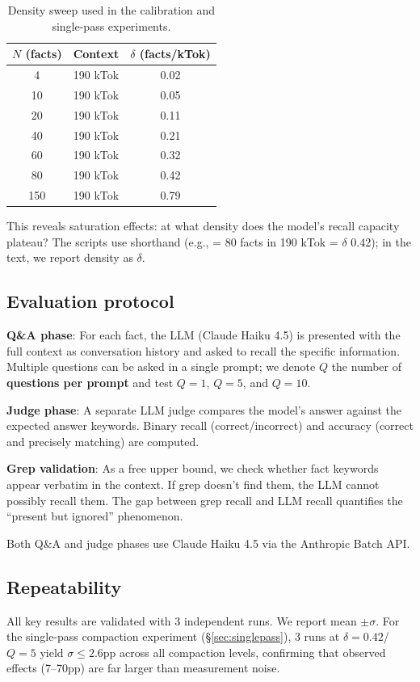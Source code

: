 \begin{table}[h]
\centering
\caption{Density sweep used in the calibration and single-pass experiments.}
\label{tab:density-sweep}
\begin{tabular}{ccc}
\toprule
$N$ (facts) & Context & $\delta$ (facts/kTok) \\
\midrule
4   & 190 kTok & 0.02 \\
10  & 190 kTok & 0.05 \\
20  & 190 kTok & 0.11 \\
40  & 190 kTok & 0.21 \\
60  & 190 kTok & 0.32 \\
80  & 190 kTok & 0.42 \\
150 & 190 kTok & 0.79 \\
\bottomrule
\end{tabular}
\end{table}

This reveals saturation effects: at what density does the model's recall
capacity plateau? The scripts use shorthand  (e.g.,  = 80 facts in
190 kTok = $\delta$ 0.42); in the text, we report density as $\delta$.

\subsection{Evaluation protocol}
\label{sec:eval-protocol}

\textbf{Q\&A phase}: For each fact, the LLM (Claude Haiku 4.5) is presented with
the full context as conversation history and asked to recall the specific
information. Multiple questions can be asked in a single prompt; we denote
$Q$ the number of \textbf{questions per prompt} and test $Q=1$, $Q=5$, and $Q=10$.

\textbf{Judge phase}: A separate LLM judge compares the model's answer against the
expected answer keywords. Binary recall (correct/incorrect) and accuracy
(correct and precisely matching) are computed.

\textbf{Grep validation}: As a free upper bound, we check whether fact keywords
appear verbatim in the context. If grep doesn't find them, the LLM cannot
possibly recall them. The gap between grep recall and LLM recall quantifies
the ``present but ignored'' phenomenon.

Both Q\&A and judge phases use Claude Haiku 4.5 via the Anthropic Batch API.

\subsection{Repeatability}
\label{sec:repeatability}

All key results are validated with 3 independent runs. We report mean $\pm \sigma$.
For the single-pass compaction experiment (\S\ref{sec:singlepass}), 3 runs at $\delta=0.42$/$Q=5$ yield $\sigma \leq 2.6$pp
across all compaction levels, confirming that observed effects (7--70pp) are
far larger than measurement noise.
